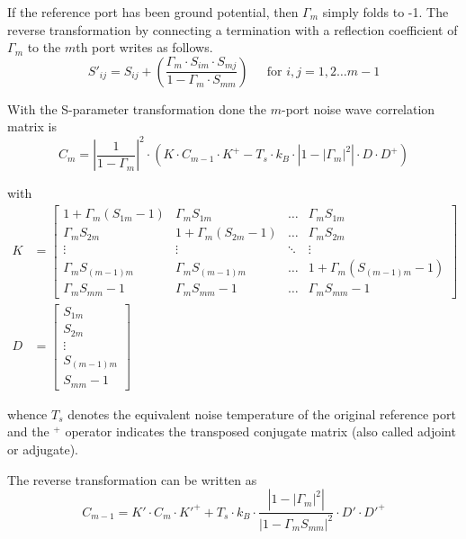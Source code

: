 If the reference port has been ground potential, then $\Gamma_m$
simply folds to -1.  The reverse transformation by connecting a
termination with a reflection coefficient of $\Gamma_m$ to the $m$th
port writes as follows.
\begin{equation}
S'_{ij} = S_{ij} + \left(\dfrac{\Gamma_m\cdot S_{im}\cdot S_{mj}}{1 - \Gamma_m\cdot S_{mm}}\right)
\;\;\;\; \textrm{ for } i,j = 1,2 \ldots m - 1
\end{equation}

With the S-parameter transformation done the $m$-port noise wave
correlation matrix is
\begin{equation}
C_m = \left|\dfrac{1}{1 - \Gamma_m}\right|^2 \cdot \left(K\cdot C_{m-1}\cdot K^+ -T_s\cdot k_B \cdot\left|1 - \left|\Gamma_m\right|^2\right|\cdot D\cdot D^+\right)
\end{equation}

with
\begin{align}
K &=
\begin{bmatrix}
1 + \Gamma_m\left(S_{1m} -1\right) & \Gamma_m S_{1m} & \ldots & \Gamma_m S_{1m}\\
\Gamma_m S_{2m} & 1 + \Gamma_m\left(S_{2m} -1\right) & \ldots & \Gamma_m S_{2m}\\
\vdots & \vdots & \ddots & \vdots\\
\Gamma_m S_{(m-1)m} & \Gamma_m S_{(m-1)m} & \ldots & 1 + \Gamma_m\left(S_{(m-1)m} -1\right)\\
\Gamma_m S_{mm} - 1 & \Gamma_m S_{mm} - 1 & \ldots & \Gamma_m S_{mm} - 1
\end{bmatrix}\\
D &=
\begin{bmatrix}
S_{1m}\\
S_{2m}\\
\vdots\\
S_{(m-1)m}\\
S_{mm} - 1
\end{bmatrix}
\end{align}

whence $T_s$ denotes the equivalent noise temperature of the original
reference port and the $ ^{+}$ operator indicates the transposed
conjugate matrix (also called adjoint or adjugate).

\addvspace{12pt}

The reverse transformation can be written as
\begin{equation}
C_{m-1} = K'\cdot C_m\cdot K'^+ +T_s\cdot k_B \cdot\dfrac{\left|1 - \left|\Gamma_m\right|^2\right|}{\left|1 - \Gamma_m S_{mm}\right|^2}\cdot D'\cdot D'^+
\end{equation}

